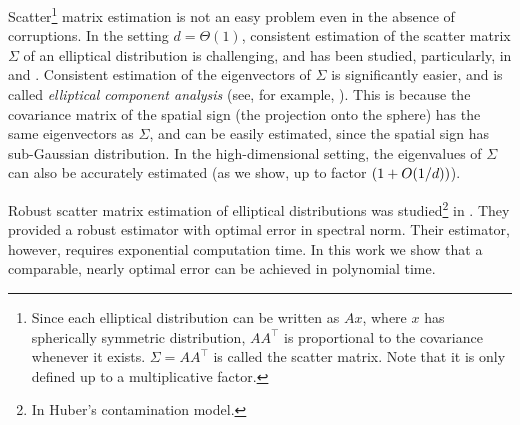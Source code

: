 Scatter\footnote{Since each elliptical distribution can be written as $Ax$, where $x$ has spherically symmetric distribution, $AA^\top$ is proportional to the covariance whenever it exists. $\Sigma = AA^\top$ is called the scatter matrix. Note that it is only defined up to a multiplicative factor.} matrix estimation is not an easy problem even in the absence of corruptions. In the setting $d=\Theta(1)$, consistent estimation of the scatter matrix $\Sigma$ of an elliptical distribution is challenging, and has been studied, particularly, in \cite{Tyler1987StatisticalAF} and \cite{MAGYAR-TYLER}. 
Consistent estimation of the eigenvectors of $\Sigma$ is significantly easier, and is called \emph{elliptical component analysis} (see, for example, \cite{ECA}). 
This is because the covariance matrix of the spatial sign (the projection onto the sphere) has the same eigenvectors as $\Sigma$, and can be easily estimated, since the spatial sign has sub-Gaussian distribution. In the high-dimensional setting, the eigenvalues of $\Sigma$ can also be accurately estimated (as we show, up to factor $\Paren{1 + O(1/d)}$).



Robust scatter matrix estimation of elliptical distributions was studied\footnote{In Huber's contamination model.} in \cite{chen2018robust}. They provided a robust estimator with optimal error in spectral norm. Their estimator, however, requires exponential computation time. In this work we show that a comparable, nearly optimal error can be achieved in polynomial time.
